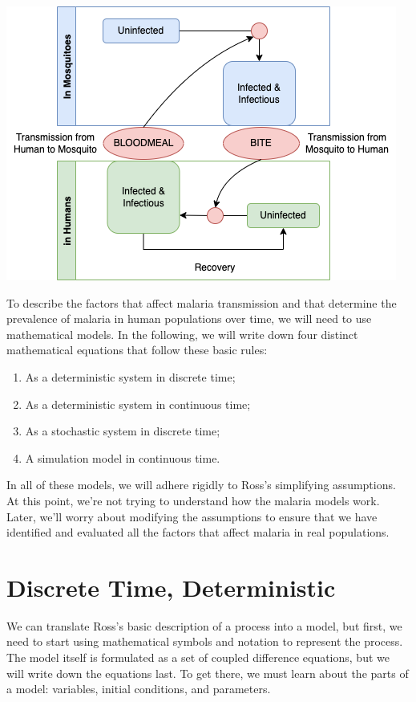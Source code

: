 \documentclass[
]{book}
\begin{document}
\includegraphics{Figures/LifeCycleModel.png}

To describe the factors that affect malaria transmission and that determine the prevalence of malaria in human populations over time, we will need to use mathematical models. In the following, we will write down four distinct mathematical equations that follow these basic rules:

\begin{enumerate}
\def\labelenumi{\arabic{enumi}.}
\item
  As a deterministic system in discrete time;
\item
  As a deterministic system in continuous time;
\item
  As a stochastic system in discrete time;
\item
  A simulation model in continuous time.
\end{enumerate}

In all of these models, we will adhere rigidly to Ross's simplifying assumptions. At this point, we're not trying to understand how the malaria models work. Later, we'll worry about modifying the assumptions to ensure that we have identified and evaluated all the factors that affect malaria in real populations.

\section{Discrete Time, Deterministic}\label{discrete-time-deterministic}

We can translate Ross's basic description of a process into a model, but first, we need to start using mathematical symbols and notation to represent the process. The model itself is formulated as a set of coupled difference equations, but we will write down the equations last. To get there, we must learn about the parts of a model: variables, initial conditions, and parameters.
\end{document}
